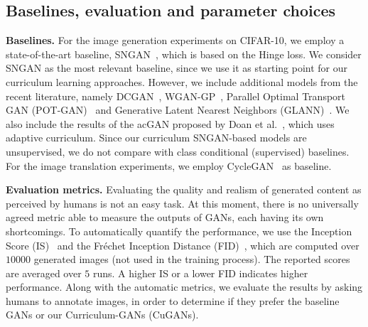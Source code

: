 \documentclass[10pt,twocolumn,letterpaper]{article}
\begin{document}
\vspace{-0.1cm}
\subsection{Baselines, evaluation and parameter choices}
\vspace{-0.1cm}

\noindent 
{\bf Baselines.}
For the image generation experiments on CIFAR-10, we employ a state-of-the-art baseline, SNGAN~\cite{Miyato-ICLR-2018}, which is based on the Hinge loss. We consider SNGAN as the most relevant baseline, since we use it as starting point for our curriculum learning approaches. However, we include additional models from the recent literature, namely DCGAN~\cite{Radford-ICLR-2016}, WGAN-GP~\cite{Gulrajani-NIPS-2017}, Parallel Optimal Transport GAN (POT-GAN)~\cite{Avraham-CVPR-2019} and Generative Latent Nearest Neighbors (GLANN)~\cite{Hoshen-CVPR-2019}. We also include the results of the acGAN proposed by Doan et al.~\cite{Doan-AAAI-2019}, which uses adaptive curriculum. Since our curriculum SNGAN-based models are unsupervised, we do not compare with class conditional (supervised) baselines.
For the image translation experiments, we employ CycleGAN~\cite{Zhu-ICCV-2017} as baseline. 

\noindent 
{\bf Evaluation metrics.}
Evaluating the quality and realism of generated content as perceived by humans is not an easy task. At this moment, there is no universally agreed metric able to measure the outputs of GANs, each having its own shortcomings. To automatically quantify the performance, we use the Inception Score (IS)~\cite{Salimans-NIPS-2016} and the Fr\'echet Inception Distance (FID)~\cite{Heusel-NIPS-2017}, which are computed over $10000$ generated images (not used in the training process). The reported scores are averaged over $5$ runs. A higher IS or a lower FID indicates higher performance.
Along with the automatic metrics, we evaluate the results by asking humans to annotate images, in order to determine if they prefer the baseline GANs or our Curriculum-GANs (CuGANs). 
\end{document}
